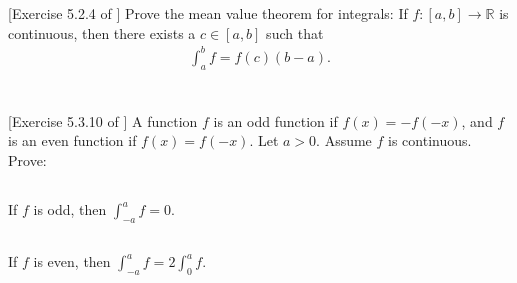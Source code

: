 \documentclass[11pt,letterpaper]{article}
\begin{document}
\section{} [Exercise 5.2.4 of \cite{Lebl_23}] 
Prove the mean value theorem for integrals: If $f:[a,b]\to\mathbb{R}$ is continuous, then there exists a $c\in[a,b]$ such that
\begin{align}
    \int^b_a f = f(c)(b-a).
\end{align}

\section{} [Exercise 5.3.10 of \cite{Lebl_23}] 
A function $f$ is an odd function if $f(x)=-f(-x)$, and $f$ is an even function if $f(x)=f(-x)$. Let $a> 0$. Assume $f$ is continuous. Prove:

\subsection{}
If $f$ is odd, then $\int^a_{-a} f = 0$.

\subsection{}
If $f$ is even, then $\int^a_{-a} f = 2\int^a_{0} f$.


\vfill
\printbibliography
\end{document}
